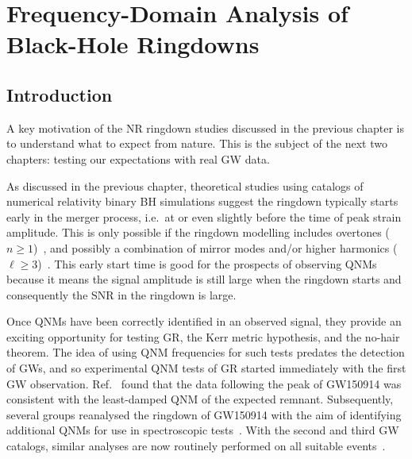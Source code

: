 
\chapter{Frequency-Domain Analysis of Black-Hole Ringdowns}

\label{Chapter3}

\section{Introduction}\label{ch3:sec:introduction}

A key motivation of the NR ringdown studies discussed in the previous chapter is to understand what to expect from nature. 
This is the subject of the next two chapters: testing our expectations with real GW data.

As discussed in the previous chapter, theoretical studies using catalogs of numerical relativity binary BH simulations suggest the ringdown typically starts early in the merger process, i.e.\ at or even slightly before the time of peak strain amplitude. 
This is only possible if the ringdown modelling includes overtones ($n \geq 1$)~\cite{Giesler:2019uxc, JimenezForteza:2020cve, Forteza:2021wfq}, and possibly a combination of mirror modes and/or higher harmonics ($\ell\geq 3$)~\cite{Cook:2020otn, Dhani:2020nik, Finch:2021iip}.
This early start time is good for the prospects of observing QNMs because it means the signal amplitude is still large when the ringdown starts and consequently the SNR in the ringdown is large.

Once QNMs have been correctly identified in an observed signal, they provide an exciting opportunity for testing GR, the Kerr metric hypothesis, and the no-hair theorem. 
The idea of using QNM frequencies for such tests predates the detection of GWs, and so experimental QNM tests of GR started immediately with the first GW observation.
Ref.~\cite{LIGOScientific:2016lio} found that the data following the peak of GW150914 was consistent with the least-damped QNM of the expected remnant.
Subsequently, several groups reanalysed the ringdown of GW150914 with the aim of identifying additional QNMs for use in spectroscopic tests~\cite{Carullo:2019flw, Isi:2019aib, Brito:2018rfr}. 
With the second and third GW catalogs, similar analyses are now routinely performed on all suitable events~\cite{LIGOScientific:2020tif, LIGOScientific:2021sio}.


